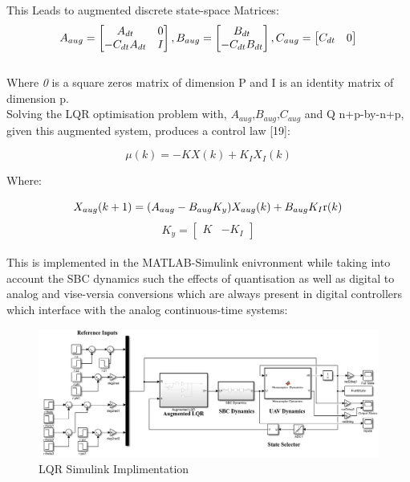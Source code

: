 \documentclass[12pt,a4paper,twoside]{report}
\begin{document}
				This Leads to augmented discrete state-space Matrices:
				\\
				\begin{equation}
					A_{aug} =
					\begin{bmatrix}
						A_{dt} & \emph{\emph{0}} \\
						-C_{dt}A_{dt} & I
					\end{bmatrix}
					,
					B_{aug} =
					\begin{bmatrix}
						B_{dt}\\
						-C_{dt}B_{dt}
					\end{bmatrix}
					,
					C_{aug} =
					\begin{bmatrix}
						C_{dt} & \emph{\emph{0}}
					\end{bmatrix}
				\end{equation}
				\\   
				Where \emph{\emph{0}} is a square zeros matrix of dimension P and I is an identity matrix of dimension p.
				\\
				Solving the LQR optimisation problem with, $A_{aug}$,$B_{aug}$,$C_{aug}$ and Q n+p-by-n+p, given this augmented system, produces a control law [19]: 
				
				\begin{equation}
					\mu(k) = - K X(k) + K_I X_I(k)
				\end{equation}
				
				Where:
				
				\begin{equation}
					X_{aug}(k+1) = (A_{aug} - B_{aug}K_{y}) X_{aug}(k) + B_{aug}K_I \emph{\emph{r}}(k)
				\end{equation}
				\[
					K_{y} =
					\begin{bmatrix}
						K & -K_{I}
					\end{bmatrix}
				\]
				\\
				This is implemented in the MATLAB-Simulink enivronment while taking into account the SBC dynamics such the effects of quantisation as well as digital to analog and vise-versia conversions which are always present in digital controllers which interface with the analog continuous-time systems:
				\\
				\begin{figure}[h!]
					\centering
					\includegraphics[width=1\linewidth]{LQRSimulink.png}
					\caption{LQR Simulink Implimentation}
					\label{fig:lqrsimulinkimplimentation}
				\end{figure}
				
\end{document}
